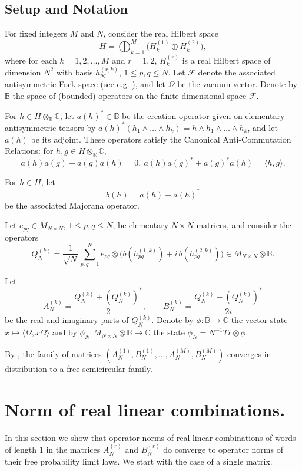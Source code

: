 \documentclass[11pt]{article}
\begin{document}
\subsection{Setup and Notation}\label{sect:CARMatrices}
For fixed integers $M$ and $N$, consider the real Hilbert space  \[H=\bigoplus_{k=1}^M \bigl(H_{k}^{(1)} \oplus H_{k}^{(2)}\bigr),\] where for each 
$k=1,2,\dots,M$ and $r=1,2$,  $H_k^{(r)}$ is  a real Hilbert space of dimension $N^2$ with basis $h_{pq}^{(r,k)}$, $1\leq p,q\leq N$.  Let $\mathscr{F}$ denote the associated antisymmetric Fock space (see e.g. \cite{bratteli-robinson}), and let $\Omega$ be the vacuum vector. Denote by $\mathbb{B}$ the space of (bounded) operators on the finite-dimensional space $\mathscr{F}$. 

For $h \in H\otimes_{\mathbb{R}} \mathbb{C}$, let $a(h)^*\in \mathbb{B}$ be the creation operator given on elementary antisymmetric tensors by $ a(h)^* (h_1\wedge \dots \wedge h_k) = h\wedge h_1\wedge \dots \wedge h_k$,
and let $a(h)$ be its adjoint.  These operators satisfy the Canonical Anti-Commutation Relations: for $h,g\in H\otimes_{\mathbb{R}} \mathbb{C}$,
\[
a(h) a(g) + a(g) a(h) = 0,\ a(h)a(g)^* + a(g)^* a(h) = \langle h,g\rangle.
\]

For $h\in H$, let
\[
b(h) = a(h) + a(h)^*
\] be the associated Majorana operator.

Let $e_{pq} \in M_{N\times N}$, $1\leq p,q\leq N$, be elementary $N\times N$ matrices, and consider the operators
\[
Q^{(k)}_N = \frac{1}{\sqrt{N}} \sum_{p,q=1}^N e_{pq} \otimes \bigl(b(h^{(1,k)}_{pq}) + i\, b(h^{(2,k)}_{pq})\bigr) \in M_{N\times N}\otimes \mathbb{B}.
\] 

Let
\[
A^{(k)}_N = \frac{Q^{(k)}_N + (Q^{(k)}_N)^*}{2}, \qquad
B^{(k)}_N = \frac{Q^{(k)}_N - (Q^{(k)}_N)^*}{2i}
\] be the real and imaginary parts of $Q_N^{(k)}$.  Denote by $\phi:\mathbb{B}\to\mathbb{C}$ the vector state $x\mapsto \langle \Omega , x\Omega\rangle$ and by $\phi_N: M_{N\times N}\otimes \mathbb{B}\to \mathbb{C}$ the state $\phi_N= N^{-1} Tr\otimes \phi$.

By \cite{Voiculescu:Random}, the family of matrices  $(A_N^{(1)},B_N^{(1)},\dots,A_N^{(M)}, B_N^{(M)})$ converges in distribution to a free semicircular family. 


\section{Norm of real linear combinations.}
In this section we show that operator norms of real linear combinations of words of length $1$ in the matrices $A_N^{(r)}$ and $B_N^{(r)}$ do converge to operator norms of their free probability limit laws. We start with the case of a single matrix.
\end{document}
